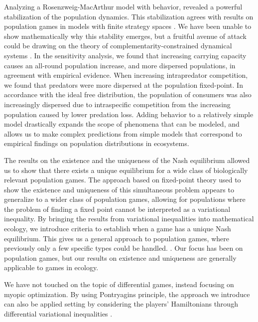 
Analyzing a Rosenzweig-MacArthur model with behavior, revealed a powerful stabilization of the population dynamics. This stabilization agrees with results on population games in models with finite strategy spaces \citep{kvrivan2007lotka, valdovinos2010consequences}. We have been unable to show mathematically why this stability emerges, but a fruitful avenue of attack could be drawing on the theory of complementarity-constrained dynamical systems \citep{adly2018variational,brogliato2020dynamical}.  In the sensitivity analysis, we found that increasing carrying capacity causes an all-round population increase, and more dispersed populations, in agreement with empirical evidence. When increasing intrapredator competition, we found that predators were more dispersed at the population fixed-point. In accordance with the ideal free distribution, the population of consumers was also increasingly dispersed due to intraspecific competition from the increasing population caused by lower predation loss. Adding behavior to a relatively simple model drastically expands the scope of phenomena that can be modeled, and allows us to make complex predictions from simple models that correspond to empirical findings on population distributions in ecosystems.


The results on the existence and the uniqueness of the Nash equilibrium allowed us to show that there exists a unique equilibrium for a wide class of biologically relevant population games. The approach based on fixed-point theory used to show the existence and uniqueness of this simultaneous problem appears to generalize to a wider class of population games, allowing for populations where the problem of finding a fixed point cannot be interpreted as a variational inequality. By bringing the results from variational inequalities into mathematical ecology, we introduce criteria to establish when a game has a unique Nash equilibrium. This gives us a general approach to population games, where previously only a few specific types could be handled. \citep{sandholm2010population}. Our focus has been on population games, but our results on existence and uniqueness are generally applicable to games in ecology.


We have not touched on the topic of differential games, instead focusing on myopic optimization. By using Pontryagins principle, the approach we introduce can also be applied setting by considering the players' Hamiltonians through differential variational inequalities \citep{pang2008differential}.


